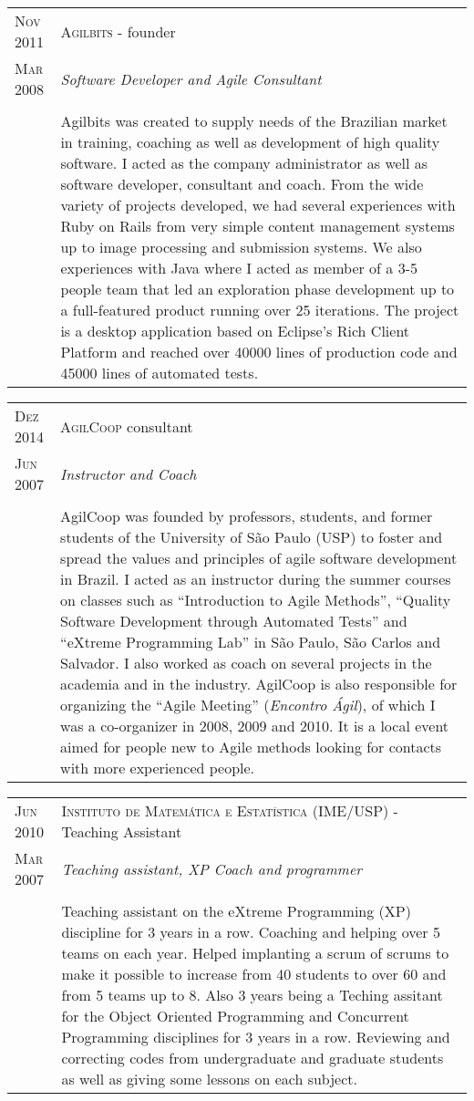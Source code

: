 \documentclass[letter,10pt]{article}
\begin{document}
\begin{tabular}{p{2.5cm}|p{13.5cm}}
  \textsc{Nov 2011} & \textsc{Agilbits} - founder\\
  \textsc{Mar 2008}& \emph{Software Developer and Agile Consultant}\\
  &\\
  &Agilbits was created
  to supply needs of the Brazilian market in training, coaching as
  well as development of high quality software. I acted as the
  company administrator as well as software developer, consultant
  and coach.
  From the wide variety of projects developed, we had several
  experiences with Ruby on Rails from very simple content management
  systems up to image processing and submission systems.
  We also experiences with Java where I acted as member of a 3-5
  people team that led an exploration phase development up to a
  full-featured product running over 25 iterations. The project is a
  desktop application based on Eclipse's Rich Client Platform and
  reached over 40000 lines of production code and 45000 lines of
  automated tests.
\end{tabular}

\begin{tabular}{p{2.5cm}|p{13.5cm}}
  \textsc{Dez 2014} & \textsc{AgilCoop} consultant\\
  \textsc{Jun 2007}& \emph{Instructor and Coach}\\
  &\\
  &AgilCoop was founded by professors,
  students, and former students of the University of São Paulo (USP)
  to foster and spread the values and principles of agile software
  development in Brazil. I acted as an instructor during the summer
  courses on classes such as ``Introduction to Agile Methods'',
  ``Quality Software Development through Automated Tests'' and
  ``eXtreme Programming Lab'' in São Paulo, São Carlos and Salvador.
  I also worked as coach on several projects in the academia
  and in the industry. AgilCoop is also responsible for organizing
  the ``Agile Meeting'' (\emph{Encontro Ágil}), of which I was a
  co-organizer in 2008, 2009 and 2010. It is a local
  event aimed for people new to Agile methods looking for contacts
  with more experienced people.
\end{tabular}

\begin{tabular}{p{2.5cm}|p{13.5cm}}
  \textsc{Jun 2010} & \textsc{Instituto de Matemática e Estatística
    (IME/USP)} - Teaching Assistant\\
  \textsc{Mar 2007}& \emph{Teaching assistant, XP Coach and programmer}\\
  &\\
  & Teaching assistant on the eXtreme Programming (XP) discipline for
  3 years in a row. Coaching and helping over 5 teams on each
  year. Helped implanting a scrum of scrums to make it possible to
  increase from 40 students to over 60 and from 5 teams up to 8.
  Also 3 years being a Teching assitant for the Object Oriented
  Programming and Concurrent Programming disciplines for 3 years in a
  row. Reviewing and correcting codes from undergraduate and graduate
  students as well as giving some lessons on each subject.
\end{tabular}
\end{document}
